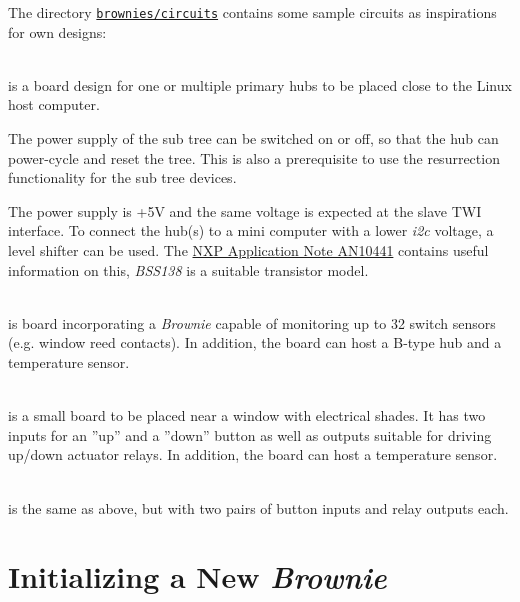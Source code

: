 \documentclass[12pt,english,parskip=half,headheight=19pt]{scrreprt}
\renewenvironment{description}[1][8ex]
  {\list{}{\labelwidth=5ex \leftmargin=#1 \let\makelabel\descriptionlabel}}
  {\endlist}
\newcommand{\refsrc}[1]{\href{#1}{\texttt{#1}}}     %
\begin{document}
The directory \refsrc{brownies/circuits} contains some sample circuits as inspirations for own designs:
\begin{description}
  \item[Hub Card (\code{hubcard})] ~ \\
    is a board design for one or multiple primary hubs to be placed close to the Linux host computer.

    The power supply of the sub tree can be switched on or off, so that the hub can power-cycle and
    reset the tree. This is also a prerequisite to use the resurrection functionality for the sub tree
    devices.

    The power supply is +5V and the same voltage is expected at the slave TWI interface. To connect
    the hub(s) to a mini computer with a lower \textit{i2c} voltage, a level shifter can be used.
    The \href{https://www.nxp.com/docs/en/application-note/AN10441.pdf}{NXP Application Note AN10441}
    contains useful information on this, \textit{BSS138} is a suitable transistor model.

  \item[Matrix 4x8 (\code{matrix4x8})] ~ \\
    is board incorporating a \textit{Brownie} capable of monitoring up to 32 switch sensors
    (e.g. window reed contacts). In addition, the board can host a B-type hub and a temperature
    sensor.

  \item[Window (\code{window})] ~ \\
    is a small board to be placed near a window with electrical shades.
    It has two inputs for an ''up'' and a ''down'' button as well as outputs suitable for driving up/down actuator relays.
    In addition, the board can host a temperature sensor.

  \item[Dual Window (\code{window_dual})] ~ \\
    is the same as above, but with two pairs of button inputs and relay outputs each.

\end{description}





\section{Initializing a New \textit{Brownie}}
\label{sec:brownies-init}
\end{document}
